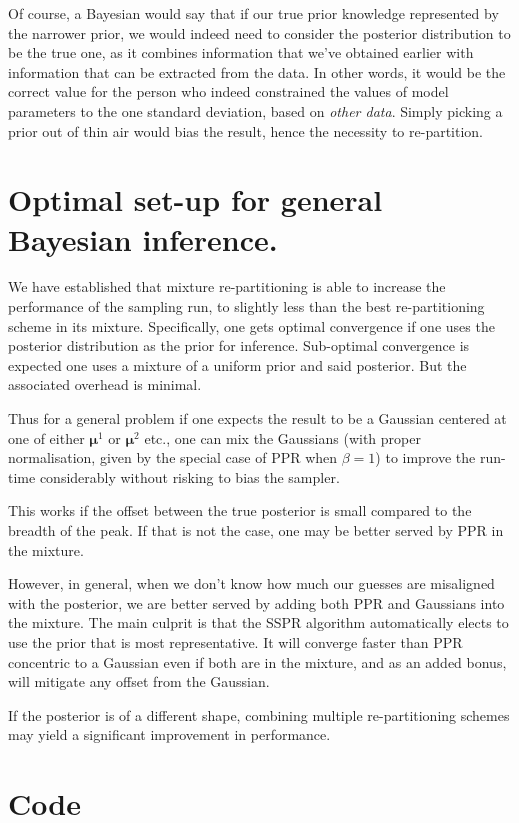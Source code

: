 \documentclass[usenatbib]{mnras}
\begin{document}
Of course, a Bayesian would say that if our true prior knowledge
represented by the narrower prior, we would indeed need to consider
the posterior distribution to be the true one, as it combines
information that we've obtained earlier with information that can
be extracted from the data. In other words, it would be the correct
value for the person who indeed constrained the values of model
parameters to the one standard deviation, based on \emph{other
data}. Simply picking a prior out of thin air would bias the
result, hence the necessity to re-partition.

\section{Optimal set-up for general Bayesian inference.}\label{sec:org545e9e3}

We have established that mixture re-partitioning is able to
increase the performance of the sampling run, to slightly less than
the best re-partitioning scheme in its mixture. Specifically, one
gets optimal convergence if one uses the posterior distribution as
the prior for inference. Sub-optimal convergence is expected one
uses a mixture of a uniform prior and said posterior. But the
associated overhead is minimal.

Thus for a general problem if one expects the result to be a
Gaussian centered at one of either \(\bm{\mu}^{1}\) or \(\bm{\mu}^{2}\) etc.,
one can mix the Gaussians (with proper normalisation, given by the
special case of PPR when \(\beta=1\)) to improve the run-time
considerably without risking to bias the sampler.

This works if the offset between the true posterior is small
compared to the breadth of the peak. If that is not the case, one
may be better served by PPR in the mixture.

However, in general, when we don't know how much our guesses are
misaligned with the posterior, we are better served by adding both
PPR and Gaussians into the mixture. The main culprit is that the
SSPR algorithm automatically elects to use the prior that is most
representative. It will converge faster than PPR concentric to a
Gaussian even if both are in the mixture, and as an added bonus,
will mitigate any offset from the Gaussian.

If the posterior is of a different shape, combining multiple
re-partitioning schemes may yield a significant improvement in
performance.
\section{Code}\label{sec:orgf188846}
\end{document}
